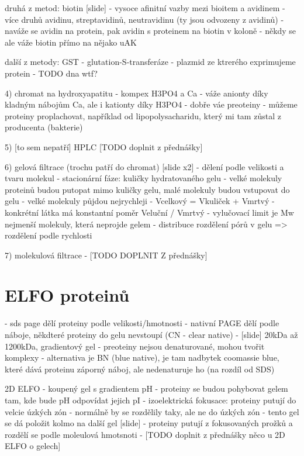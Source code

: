 \documentclass[DIV=8]{scrreprt}
\begin{document}
druhá z metod: biotin [slide]
- vysoce afinitní vazby mezi bioitem a avidinem
- více druhů avidinu, streptavidinů, neutravidinu (ty jsou odvozeny z avidinů)
- naváže se avidin na protein, pak avidin s proteinem na biotin v koloně
    - někdy se ale váže biotin přímo na nějako uAK

další z metody: GST
- glutation-S-transferáze
- plazmid ze ktrerého exprimujeme protein
- TODO dna wtf?

4) chromat na hydroxyapatitu
- kompex H3PO4 a Ca
- váže anionty díky kladným nábojům Ca, ale i kationty díky H3PO4
- dobře váe preoteiny
    - můžeme proteiny proplachovat, například od lipopolysacharidu, který mi tam zůstal z producenta (bakterie)

5) [to sem nepatří] HPLC
[TODO doplnit z přednášky]

6) gelová filtrace (trochu patří do chromat) [slide x2]
- dělení podle velikosti a tvaru molekul
- stacionární fáze: kuličky hydratovaného gelu
- velké molekuly proteinů budou putopat mimo kuličky gelu, malé molekuly budou vstupovat do gelu
- velké molekuly půjdou nejrychleji
    - Vcelkový = Vkuliček + Vmrtvý
    - konkrétní látka má konstantní poměr Veluční / Vmrtvý
    - vylučovací limit je Mw nejmenší molekuly, která neprojde gelem
- distribuce rozdělení pórů v gelu => rozdělení podle rychlosti

7) molekulová filtrace
- [TODO DOPLNIT Z přednášky]

\section{ELFO proteinů} \label{ELFO proteinů}

- sds page dělí proteiny podle velikosti/hmotnosti
- nativní PAGE dělí podle náboje, někdteré proteiny do gelu nevstoupí (CN - clear native)
- [slide] 20kDa až 1200kDa, gradientový gel
- preoteiny nejsou denaturované, mohou tvořit komplexy
- alternativa je BN (blue native), je tam nadbytek coomassie blue, které dává proteinu záporný náboj, ale nedenaturuje ho (na rozdíl od SDS)

2D ELFO
- koupený gel s gradientem pH
- proteiny se budou pohybovat gelem tam, kde bude pH odpovídat jejich pI
    - izoelektrická fokusace: proteiny putují do velcie úzkých zón
    - normálně by se rozdělily taky, ale ne do úzkých zón
- tento gel se dá položit kolmo na další gel [slide]
    - proteiny putují z fokusovaných prožků a rozdělí se podle moleulová hmotsnoti
- [TODO doplnit z přednášky něco u 2D ELFO o gelech]
\end{document}
